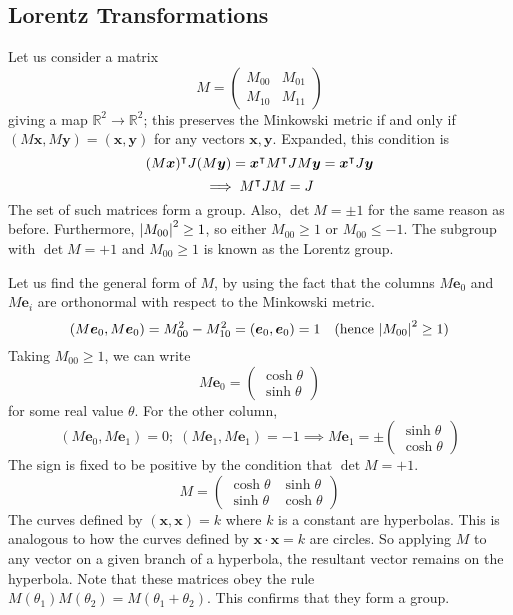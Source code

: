 \documentclass{article}
\begin{document}
	\subsection{Lorentz Transformations}
	Let us consider a matrix
	\[ M = \begin{pmatrix}
		M_{00} & M_{01} \\
		M_{10} & M_{11}
	\end{pmatrix} \]
	giving a map $\mathbb R^2 \to \mathbb R^2$; this preserves the Minkowski metric if and only if $(M\bm x, M\bm y) = (\bm x, \bm y)$ for any vectors $\bm x, \bm y$. Expanded, this condition is
	\[ (M\bm x)^\intercal J(M \bm y) = \bm x^\intercal M^\intercal J M \bm y = \bm x^\intercal J \bm y \]
	\[ \implies M^\intercal J M = J \]
	The set of such matrices form a group. Also, $\det M = \pm 1$ for the same reason as before. Furthermore, $\abs{M_{00}}^2 \geq 1$, so either $M_{00} \geq 1$ or $M_{00} \leq -1$. The subgroup with $\det M = +1$ and $M_{00} \geq 1$ is known as the Lorentz group.

	Let us find the general form of $M$, by using the fact that the columns $M \bm e_0$ and $M \bm e_i$ are orthonormal with respect to the Minkowski metric.
	\[ (M \bm e_0, M \bm e_0) = M_{00}^2 - M_{10}^2 = (\bm e_0, \bm e_0) = 1\quad (\text{hence } \abs{M_{00}}^2 \geq 1) \]
	Taking $M_{00} \geq 1$, we can write
	\[ M\bm e_0 = \begin{pmatrix}
		\cosh \theta \\ \sinh \theta
	\end{pmatrix} \]
	for some real value $\theta$. For the other column,
	\[ (M \bm e_0, M \bm e_1) = 0;\; (M \bm e_1, M \bm e_1) = -1 \implies M \bm e_1 = \pm\begin{pmatrix}
		\sinh \theta \\
		\cosh \theta
	\end{pmatrix} \]
	The sign is fixed to be positive by the condition that $\det M = +1$.
	\[ M = \begin{pmatrix}
		\cosh \theta & \sinh \theta \\
		\sinh \theta & \cosh \theta
	\end{pmatrix} \]
	The curves defined by $(\bm x, \bm x) = k$ where $k$ is a constant are hyperbolas. This is analogous to how the curves defined by $\bm x \cdot \bm x = k$ are circles. So applying $M$ to any vector on a given branch of a hyperbola, the resultant vector remains on the hyperbola.
	Note that these matrices obey the rule $M(\theta_1) M(\theta_2) = M(\theta_1 + \theta_2)$. This confirms that they form a group.
\end{document}
